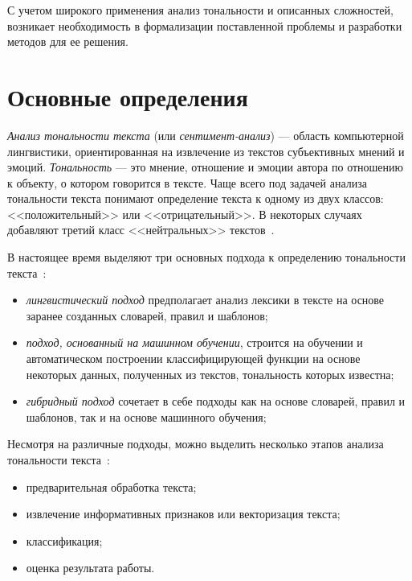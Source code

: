 С учетом широкого применения анализ тональности и описанных сложностей,
возникает необходимость в формализации поставленной проблемы и разработки
методов для ее решения.

\section{Основные определения}

\textit{Анализ тональности текста} (или \textit{сентимент-анализ}) --- область
компьютерной лингвистики, ориентированная на извлечение из текстов субъективных
мнений и эмоций. \textit{Тональность} --- это мнение, отношение и эмоции автора
по отношению к объекту, о котором говорится в тексте. Чаще всего под задачей
анализа тональности текста понимают определение текста к одному из двух классов:
<<положительный>> или <<отрицательный>>. В некоторых случаях добавляют третий
класс <<нейтральных>> текстов~\cite{article05}.

В настоящее время выделяют три основных подхода к определению тональности
текста~\cite{article05}:
\begin{itemize}
    \item \textit{лингвистический подход} предполагает анализ лексики в тексте на
        основе заранее созданных словарей, правил и шаблонов;

    \item \textit{подход, основанный на машинном обучении}, строится на обучении и
        автоматическом построении классифицирующей функции на основе
        некоторых данных, полученных из текстов, тональность которых
        известна;

    \item \textit{гибридный подход} сочетает в себе подходы как на основе
        словарей, правил и шаблонов, так и на основе машинного обучения;
\end{itemize}


Несмотря на различные подходы, можно выделить несколько этапов анализа
тональности текста~\cite{article09}:
\begin{itemize}
    \item предварительная обработка текста;
    \item извлечение информативных признаков или векторизация текста;
    \item классификация;
    \item оценка результата работы.
\end{itemize}

